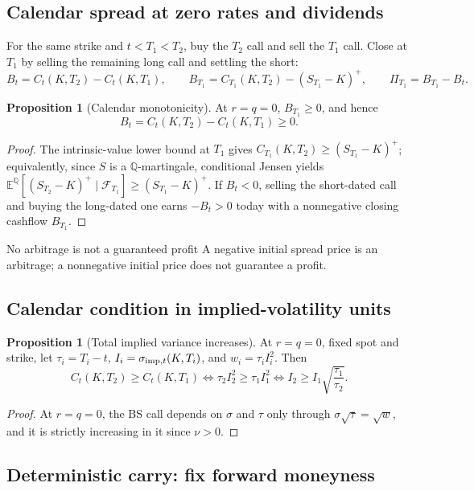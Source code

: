 \documentclass[10pt]{article}
\newcommand{\E}{\mathbb E}
\newcommand{\Q}{\mathbb Q}
\newcommand{\1}{\mathbf 1}
\newcommand{\cF}{\mathcal F}
\theoremstyle{definition}
\newtheorem{proposition}[definition]{Proposition}
\begin{document}
\subsection{Calendar spread at zero rates and dividends}

For the same strike and \(t<T_1<T_2\), buy the \(T_2\) call and sell the
\(T_1\) call. Close at \(T_1\) by selling the remaining long call and
settling the short:
\[
B_t=C_t(K,T_2)-C_t(K,T_1),\qquad
B_{T_1}=C_{T_1}(K,T_2)-(S_{T_1}-K)^+,\qquad
\boxed{\Pi_{T_1}=B_{T_1}-B_t.}
\]

\begin{proposition}[Calendar monotonicity]
At \(r=q=0\), \(B_{T_1}\ge0\), and hence
\[
\boxed{B_t=C_t(K,T_2)-C_t(K,T_1)\ge0.}
\]
\end{proposition}
\begin{proof}
The intrinsic-value lower bound at \(T_1\) gives
\(C_{T_1}(K,T_2)\ge(S_{T_1}-K)^+\); equivalently, since \(S\) is a
\(\Q\)-martingale, conditional Jensen yields
\(\E^\Q[(S_{T_2}-K)^+\mid\cF_{T_1}]\ge(S_{T_1}-K)^+\). If \(B_t<0\), selling
the short-dated call and buying the long-dated one earns \(-B_t>0\) today
with a nonnegative closing cashflow \(B_{T_1}\).
\end{proof}

\begin{warningbox}{No arbitrage is not a guaranteed profit}
A negative initial spread price is an arbitrage; a nonnegative initial price
does not guarantee a profit.
\end{warningbox}

\subsection{Calendar condition in implied-volatility units}

\begin{proposition}[Total implied variance increases]
At \(r=q=0\), fixed spot and strike, let \(\tau_i=T_i-t\),
\(I_i=\sigma_{{\rm imp},t}(K,T_i)\), and \(w_i=\tau_iI_i^2\). Then
\[
\boxed{C_t(K,T_2)\ge C_t(K,T_1)
\iff \tau_2I_2^2\ge\tau_1I_1^2
\iff I_2\ge I_1\sqrt{\frac{\tau_1}{\tau_2}}.}
\]
\end{proposition}
\begin{proof}
At \(r=q=0\), the BS call depends on \(\sigma\) and \(\tau\) only through
\(\sigma\sqrt\tau=\sqrt w\), and it is strictly increasing in it since
\(\nu>0\).
\end{proof}

\subsection{Deterministic carry: fix forward moneyness}
\end{document}
